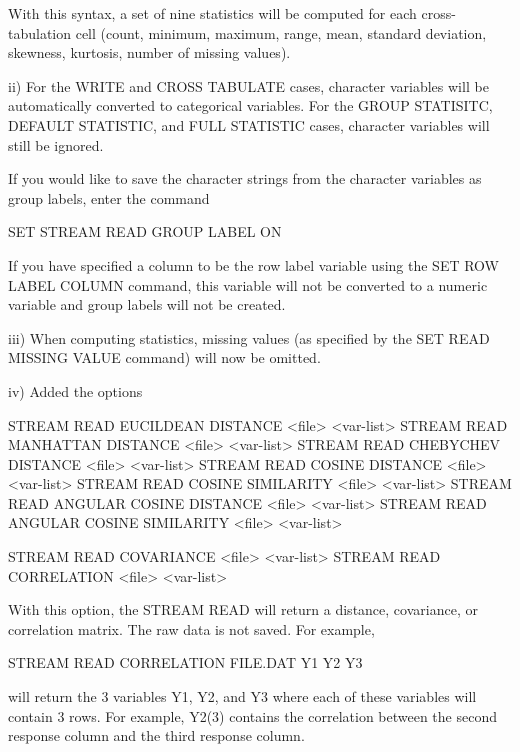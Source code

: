             With this syntax, a set of nine statistics will be computed
            for each cross-tabulation cell (count, minimum, maximum,
            range, mean, standard deviation, skewness, kurtosis, number
            of missing values).

        ii) For the WRITE and CROSS TABULATE cases, character variables
            will be automatically converted to categorical variables.  For
            the GROUP STATISITC, DEFAULT STATISTIC, and FULL STATISTIC
            cases, character variables will still be ignored.

            If you would like to save the character strings from the
            character variables as group labels, enter the command

                SET STREAM READ GROUP LABEL ON

            If you have specified a column to be the row label variable
            using the SET ROW LABEL COLUMN command, this variable will
            not be converted to a numeric variable and group labels will
            not be created.

       iii) When computing statistics, missing values (as specified by the
            SET READ MISSING VALUE command) will now be omitted.

        iv) Added the options

                STREAM READ EUCILDEAN DISTANCE <file> <var-list>
                STREAM READ MANHATTAN DISTANCE <file> <var-list>
                STREAM READ CHEBYCHEV DISTANCE <file> <var-list>
                STREAM READ COSINE DISTANCE <file> <var-list>
                STREAM READ COSINE SIMILARITY <file> <var-list>
                STREAM READ ANGULAR COSINE DISTANCE <file> <var-list>
                STREAM READ ANGULAR COSINE SIMILARITY <file> <var-list>

                STREAM READ COVARIANCE  <file> <var-list>
                STREAM READ CORRELATION <file> <var-list>

             With this option, the STREAM READ will return a distance,
             covariance, or correlation matrix.  The raw data is not
             saved.  For example,

                 STREAM READ CORRELATION FILE.DAT Y1 Y2 Y3

             will return the 3 variables Y1, Y2, and Y3 where each of
             these variables will contain 3 rows.  For example, Y2(3)
             contains the correlation between the second response column
             and the third response column.

